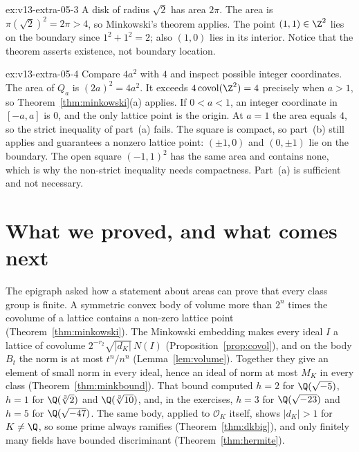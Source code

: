\begin{solution}{ex:v13-extra-05-3}
\idea A disk of radius $\sqrt2$ has area $2\pi$.
\writeup The area is $\pi(\sqrt2)^2=2\pi>4$, so Minkowski's theorem applies. The point $(1,1)\in\Z^2$ lies on the boundary since $1^2+1^2=2$; also $(1,0)$ lies in its interior. Notice that the theorem asserts existence, not boundary location.
\end{solution}

\begin{solution}{ex:v13-extra-05-4}
\idea Compare $4a^2$ with $4$ and inspect possible integer coordinates.
\writeup The area of $Q_a$ is $(2a)^2=4a^2$. It exceeds $4\operatorname{covol}(\Z^2)=4$ precisely when $a>1$, so Theorem~\ref{thm:minkowski}(a) applies. If $0<a<1$, an integer coordinate in $[-a,a]$ is $0$, and the only lattice point is the origin. At $a=1$ the area equals $4$, so the strict inequality of part~(a) fails. The square is compact, so part~(b) still applies and guarantees a nonzero lattice point: $(\pm1,0)$ and $(0,\pm1)$ lie on the boundary. The open square $(-1,1)^2$ has the same area and contains none, which is why the non-strict inequality needs compactness. Part~(a) is sufficient and not necessary.
\end{solution}

\section{What we proved, and what comes next}

The epigraph asked how a statement about areas can prove that every class group is finite. A symmetric convex body of
volume more than $2^n$ times the covolume of a lattice contains a non-zero lattice point (Theorem~\ref{thm:minkowski}).
The Minkowski embedding makes every ideal $I$ a lattice of covolume $2^{-r_2}\sqrt{|d_K|}\,N(I)$
(Proposition~\ref{prop:covol}), and on the body $B_t$ the norm is at most $t^n/n^n$ (Lemma~\ref{lem:volume}). Together they
give an element of small norm in every ideal, hence an ideal of norm at most $M_K$ in every class
(Theorem~\ref{thm:minkbound}). That bound computed $h=2$ for $\Q(\sqrt{-5})$, $h=1$ for $\Q(\sqrt[3]2)$ and
$\Q(\sqrt[3]{10})$, and, in the exercises, $h=3$ for $\Q(\sqrt{-23})$ and $h=5$ for $\Q(\sqrt{-47})$. The same body,
applied to $\mathcal O_K$ itself, shows $|d_K|>1$ for $K\ne\Q$, so some prime always ramifies (Theorem~\ref{thm:dkbig}),
and only finitely many fields have bounded discriminant (Theorem~\ref{thm:hermite}).

